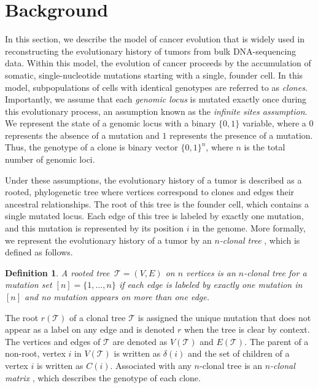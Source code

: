 \documentclass[10pt]{article}
\newtheorem{definition}{Definition}
\newcommand{\tree}{\mathcal{T}}
\begin{document}
\section{Background}

In this section, we describe the model of cancer evolution that is widely used 
\cite{malikic_clonality_2015, el-kebir_reconstruction_2015, deshwar_phylowgs_2015, 
satas_tumor_2017, myers_calder_2019, wintersinger_reconstructing_2022} 
in reconstructing the evolutionary history of tumors from bulk DNA-sequencing data. Within this model,
the evolution of cancer proceeds by the accumulation of somatic, single-nucleotide
mutations starting with a single, founder cell. 
In this model, subpopulations of cells with identical genotypes are referred to as \emph{clones}.
Importantly, we assume that each \emph{genomic locus} is mutated exactly
once during this evolutionary process, an assumption known as the \emph{infinite sites assumption}. We
represent the state of a genomic locus with a binary $\{0, 1\}$ variable, where a $0$ represents the absence 
of a mutation and $1$ represents the presence of a mutation. Thus, the genotype of a clone is binary vector 
$\{0, 1\}^n$, where $n$ is the total number of genomic loci.

Under these assumptions, the evolutionary history of a tumor is described as a rooted, phylogenetic tree 
where vertices correspond to clones and edges their ancestral 
relationships. The root of this tree is the founder cell, which contains a single mutated locus. 
Each edge of this tree is labeled by exactly one mutation, and this mutation is represented by its 
position $i$ in the genome. More formally, we represent the evolutionary history of a tumor by an 
\emph{$n$-clonal tree} \cite{el-kebir_reconstruction_2015}, which is defined as 
follows.

\begin{definition}
  A rooted tree $\,\tree = (V, E)$ on $n$ vertices is an $n$-clonal tree 
  for a mutation set $[n] = \{1, \ldots, n\}$ if each edge is
  labeled by exactly one mutation in $[n]$ and no mutation appears
  on more than one edge.
\end{definition}

The root $r(\tree)$ of a clonal tree $\tree$ is assigned the unique 
mutation that does not appear as a label on any edge and is denoted
$r$ when the tree is clear by context. The vertices and edges of $\tree$ are denoted as $V(\tree)$ and $E(\tree)$.
The parent of a non-root, vertex $i$ in $V(\tree)$ is written as $\delta(i)$ and the set of children of a vertex $i$ 
is written as $C(i)$. Associated with any $n$-clonal tree is an \emph{$n$-clonal matrix} \cite{el-kebir_reconstruction_2015}, 
which describes the genotype of each clone. 
\end{document}
